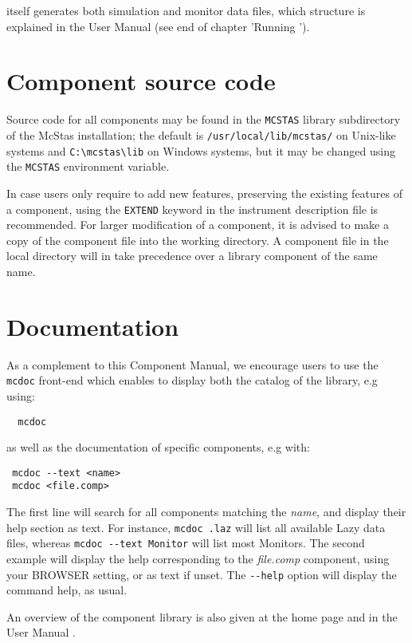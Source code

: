 \MCS itself generates both simulation and monitor data files, which structure is explained in the User Manual (see end of chapter 'Running \MCS ').

\section{Component source code}
Source code for all components may be found in the \verb+MCSTAS+ library
subdirectory of the McStas installation;
the default is \verb+/usr/local/lib/mcstas/+
on Unix-like systems and \verb+C:\mcstas\lib+ on Windows systems, but it may be
changed using the \verb+MCSTAS+ environment variable.

In case users only require to add new features, preserving the existing features of a component,
using the \verb+EXTEND+ keyword in the instrument description file is recommended. For larger modification of a component, it is advised to make a copy
of the component file into the working directory.
A component file in the local directory will in \MCS take precedence over
a library component of the same name.

\section{Documentation}
As a complement to this Component Manual, we encourage users to use
the \verb+mcdoc+ front-end which enables to display both the
catalog of the \MCS library, e.g using: 
\begin{lstlisting}
  mcdoc
\end{lstlisting}
as well as the documentation of specific components, e.g with:
\begin{lstlisting}
 mcdoc --text <name>
 mcdoc <file.comp>
\end{lstlisting}
The first line will search for all components matching the {\it name},
and display their help section as text. For instance, \verb+mcdoc .laz+ will list all available Lazy data files, whereas \verb+mcdoc --text Monitor+ will list most Monitors.
The second example will display the help corresponding to
the {\it file.comp} component, using your
BROWSER setting, or as text if unset.
The \verb+--help+ option will display the command help, as usual.

An overview of the component library is also given at the \MCS home page \cite{mcstas_webpage} and in the User Manual \cite{mcstasmanual}.

